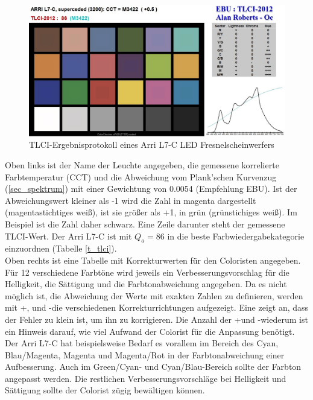 \begin{figure}[htp]     %
\centering
\includegraphics[width=1.0\textwidth]{bilder/tlci2} 
\caption {TLCI-Ergebnisprotokoll eines Arri L7-C LED Fresnelscheinwerfers\protect\footnotemark}\label{b_tlci2}
\end{figure}
Oben links ist der Name der Leuchte angegeben, die gemessene korrelierte Farbtemperatur (CCT) und die Abweichung vom Plank'schen Kurvenzug (\ref{sec_spektrum}) mit einer Gewichtung von 0.0054 (Empfehlung EBU). Ist der Abweichungswert kleiner als -1 wird die Zahl in magenta dargestellt (magentastichtiges weiß), ist sie größer als +1, in grün (grünstichiges weiß). Im Beispiel ist die Zahl daher schwarz. Eine Zeile darunter steht der gemessene TLCI-Wert. Der Arri L7-C ist mit $Q_{a}=86$ in die beste Farbwiedergabekategorie einzuordnen (Tabelle \ref{t_tlci}).\\
Oben rechts ist eine Tabelle mit Korrekturwerten für den Coloristen angegeben. Für 12 verschiedene Farbtöne wird jeweils ein Verbesserungsvorschlag für die Helligkeit, die Sättigung und die Farbtonabweichung angegeben. Da es nicht möglich ist, die Abweichung der Werte mit exakten Zahlen zu definieren, werden mit \glqq +\grqq, \grqq und \glqq -\grqq die verschiedenen Korrekturrichtungen aufgezeigt. Eine \grqq zeigt an, dass der Fehler zu klein ist, um ihn zu korrigieren. Die Anzahl der \glqq +\grqq und \glqq -\grqq wiederum ist ein Hinweis darauf, wie viel Aufwand der Colorist für die Anpassung benötigt. Der Arri L7-C hat beispielsweise Bedarf es vorallem im Bereich des Cyan, Blau/Magenta, Magenta und Magenta/Rot in der Farbtonabweichung einer Aufbesserung. Auch im Green/Cyan- und Cyan/Blau-Bereich sollte der Farbton angepasst werden. Die restlichen Verbesserungsvorschläge bei Helligkeit und Sättigung sollte der Colorist zügig bewältigen können.\\

